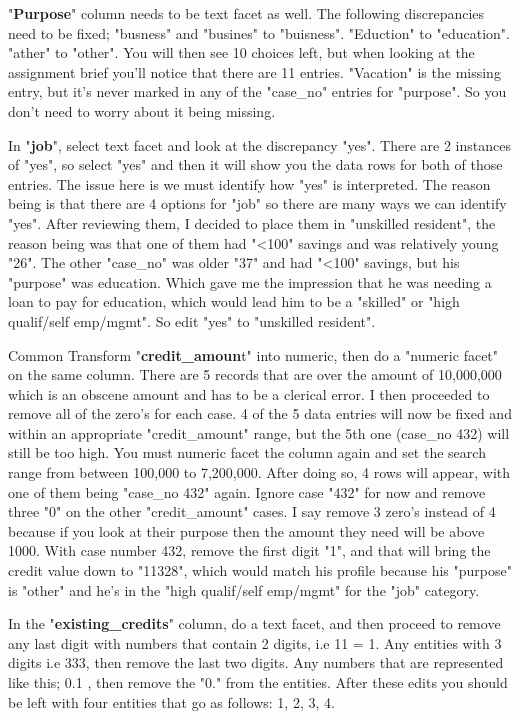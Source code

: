 \documentclass[10pt, a4paper]{article}
\begin{document}
    "\textbf{Purpose}" column needs to be text facet as well. The following discrepancies need to be fixed; "busness" and "busines" to "buisness". "Eduction" to "education". "ather" to "other". You will then see 10 choices left, but when looking at the assignment brief you'll notice that there are 11 entries. "Vacation" is the missing entry, but it's never marked in any of the "case\_no" entries for "purpose". So you don't need to worry about it being missing.
    
    In "\textbf{job}", select text facet and look at the discrepancy "yes". There are 2 instances of "yes", so select "yes" and then it will show you the data rows for both of those entries. The issue here is we must identify how "yes" is interpreted. The reason being is that there are 4 options for "job" so there are many ways we can identify "yes". After reviewing them, I decided to place them in "unskilled resident", the reason being was that one of them had "<100" savings and was relatively young "26". The other "case\_no" was older "37" and had "<100" savings, but his "purpose" was education. Which gave me the impression that he was needing a loan to pay for education, which would lead him to be a "skilled" or "high qualif/self emp/mgmt". So edit "yes" to "unskilled resident".
    
    Common Transform "\textbf{credit\_amoun}t" into numeric, then do a "numeric facet" on the same column. There are 5 records that are over the amount of 10,000,000 which is an obscene amount and has to be a clerical error. I then proceeded to remove all of the zero's for each case. 4 of the 5 data entries will now be fixed and within an appropriate "credit\_amount" range, but the 5th one (case\_no 432) will still be too high. You must numeric facet the column again and set the search range from between 100,000 to 7,200,000. After doing so, 4 rows will appear, with one of them being "case\_no 432" again. Ignore case "432" for now and remove three "0" on the other "credit\_amount" cases. I say remove 3 zero's instead of 4 because if you look at their purpose then the amount they need will be above 1000. With case number 432, remove the first digit "1", and that will bring the credit value down to "11328", which would match his profile because his "purpose" is "other" and he's in the "high qualif/self emp/mgmt" for the "job" category.
    
    In the "\textbf{existing\_credits}" column, do a text facet, and then proceed to remove any last digit with numbers that contain 2 digits, i.e 11 = 1.  Any entities with 3 digits i.e  333, then remove the last two digits. Any numbers that are represented like this; 0.1 , then remove the "0." from the entities. After these edits you should be left with four entities that go as follows: 1, 2, 3, 4.
    
\end{document}
